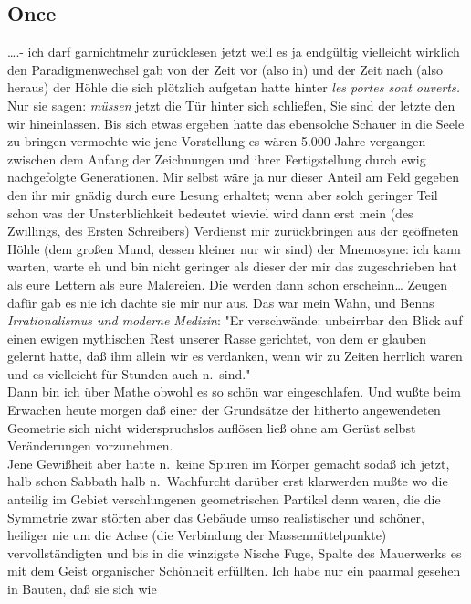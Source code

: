 \documentclass[
]{article}
\author{}
\date{\vspace{-2.5em}}
\begin{document}
\subsection{Once}\label{once}

\ldots.- ich darf garnichtmehr zurücklesen jetzt weil es ja endgültig
vielleicht wirklich den Paradigmenwechsel gab von der Zeit vor (also in)
und der Zeit nach (also heraus) der Höhle die sich plötzlich aufgetan
hatte hinter \emph{les portes sont ouverts.} Nur sie sagen:
\emph{müssen} jetzt die Tür hinter sich schließen, Sie sind der letzte
den wir hineinlassen. Bis sich etwas ergeben hatte das ebensolche
Schauer in die Seele zu bringen vermochte wie jene Vorstellung es wären
5.000 Jahre vergangen zwischen dem Anfang der Zeichnungen und ihrer
Fertigstellung durch ewig nachgefolgte Generationen. Mir selbst wäre ja
nur dieser Anteil am Feld gegeben den ihr mir gnädig durch eure Lesung
erhaltet; wenn aber solch geringer Teil schon was der Unsterblichkeit
bedeutet wieviel wird dann erst mein (des Zwillings, des Ersten
Schreibers) Verdienst mir zurückbringen aus der geöffneten Höhle (dem
großen Mund, dessen kleiner nur wir sind) der Mnemosyne: ich kann
warten, warte eh\textquotesingle{} und bin nicht geringer als dieser der
mir das zugeschrieben hat als eure Lettern als eure Malereien. Die
werden dann schon erscheinn\ldots{} Zeugen dafür gab es nie ich dachte
sie mir nur aus. Das war mein Wahn, und Benns \emph{Irrationalismus und
moderne Medizin}: "Er verschwände: unbeirrbar den Blick auf einen ewigen
mythischen Rest unserer Rasse gerichtet, von dem er glauben gelernt
hatte, daß ihm allein wir es verdanken, wenn wir zu Zeiten herrlich
waren und es vielleicht für Stunden auch n.~sind."\\
Dann bin ich über Mathe obwohl es so schön war eingeschlafen. Und wußte
beim Erwachen heute morgen daß einer der Grundsätze der hitherto
angewendeten Geometrie sich nicht widerspruchslos auflösen ließ ohne am
Gerüst selbst Veränderungen vorzunehmen.\\
Jene Gewißheit aber hatte n.~keine Spuren im Körper gemacht sodaß ich
jetzt, halb schon Sabbath halb n.~Wachfurcht darüber erst klarwerden
mußte wo die anteilig im Gebiet verschlungenen geometrischen Partikel
denn waren, die die Symmetrie zwar störten aber das Gebäude umso
realistischer und schöner, heiliger nie um die Achse (die Verbindung der
Massenmittelpunkte) vervollständigten und bis in die winzigste Nische
Fuge, Spalte des Mauerwerks es mit dem Geist organischer Schönheit
erfüllten. Ich habe nur ein paarmal gesehen in Bauten, daß sie sich wie
\end{document}
